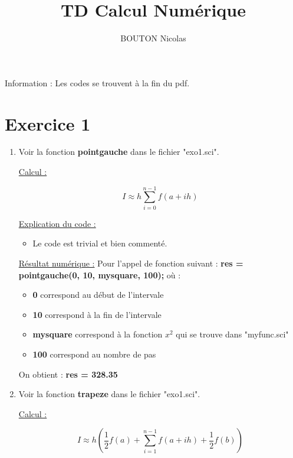 \documentclass[12pt, letterpaper]{article}
\title{TD Calcul Numérique}
\author{BOUTON Nicolas}
\begin{document}
\maketitle

Information : Les codes se trouvent à la fin du pdf.

\newpage

\section*{Exercice 1}

\begin{enumerate}
\item Voir la fonction \textbf{pointgauche} dans le fichier
  "exo1.sci".

  \underline{Calcul :}

  \begin{equation*}
    I \approx h \sum_{i = 0}^{n-1}{f(a + ih)}
  \end{equation*}


  \underline{Explication du code :}
  \begin{itemize}
    \item Le code est trivial et bien commenté.
  \end{itemize}
  
  \underline{Résultat numérique :} \newline
  Pour l'appel de fonction suivant : \newline
  \textbf{res = pointgauche(0, 10, mysquare, 100);} \newline
  où :
  \begin{itemize}
  \item \textbf{0} correspond au début de l'intervale
  \item \textbf{10} correspond à la fin de l'intervale
  \item \textbf{mysquare} correspond à la fonction $x^2$ qui se trouve
    dans \newline "myfunc.sci"
  \item \textbf{100} correspond au nombre de pas
  \end{itemize}

  On obtient : \textbf{res = 328.35}
  
\item Voir la fonction \textbf{trapeze} dans le fichier "exo1.sci".

  \underline{Calcul :}

  \begin{equation*}
    I \approx h \left( \frac{1}{2} f(a) + \sum_{i = 1}^{n-1}{f(a + ih)} + \frac{1}{2} f(b) \right)
  \end{equation*}


\end{enumerate}
\end{document}
